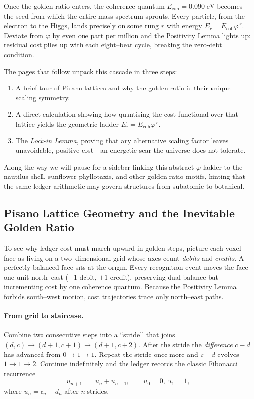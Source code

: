 \documentclass[11pt]{article}
\begin{document}
Once the golden ratio enters, the coherence quantum
\(E_{\text{coh}}=0.090\;\text{eV}\) becomes the seed from which the
entire mass spectrum sprouts.  Every particle, from the electron to the
Higgs, lands precisely on some rung \(r\) with energy
\(E_{r}=E_{\text{coh}}\varphi^{\,r}\).  Deviate from \(\varphi\) by even
one part per million and the Positivity Lemma lights up: residual cost
piles up with each eight–beat cycle, breaking the zero-debt condition.

The pages that follow unpack this cascade in three steps:

\begin{enumerate}
  \item A brief tour of Pisano lattices and why the golden ratio is their
        unique scaling symmetry.
  \item A direct calculation showing how quantising the cost functional
        over that lattice yields the geometric ladder
        \(E_{r}=E_{\text{coh}}\varphi^{\,r}\).
  \item The \textit{Lock-in Lemma}, proving that any alternative scaling
        factor leaves unavoidable, positive cost—an energetic scar the
        universe does not tolerate.
\end{enumerate}

Along the way we will pause for a sidebar linking this abstract $\varphi$-ladder
to the nautilus shell, sunflower phyllotaxis, and other golden-ratio
motifs, hinting that the same ledger arithmetic may govern structures
from subatomic to botanical.

\subsection{Pisano Lattice Geometry and the Inevitable Golden Ratio}
\label{subsec:pisano-geometry}

To see why ledger cost must march upward in golden steps, picture each voxel face
as living on a two–dimensional grid whose axes count \emph{debits} and \emph{credits}.
A perfectly balanced face sits at the origin.  Every recognition event moves the
face one unit north–east (\(+1\) debit, \(+1\) credit), preserving dual balance but
incrementing cost by one coherence quantum.  Because the Positivity Lemma forbids
south–west motion, cost trajectories trace only north–east paths.

\paragraph{From grid to staircase.}
Combine two consecutive steps into a “stride’’ that joins
\((d,c)\to(d\!+\!1,c\!+\!1)\to(d\!+\!1,c\!+\!2)\).
After the stride the \emph{difference} \(c-d\) has advanced from
\(0\to1\to1\).  Repeat the stride once more and
\(c-d\) evolves \(1\to1\to2\).  Continue indefinitely and the ledger
records the classic Fibonacci recurrence
\[
u_{n+1} \;=\; u_{n} + u_{n-1},
\qquad
u_{0}=0,\; u_{1}=1,
\]
where \(u_{n}=c_{n}-d_{n}\) after \(n\) strides.
\end{document}
